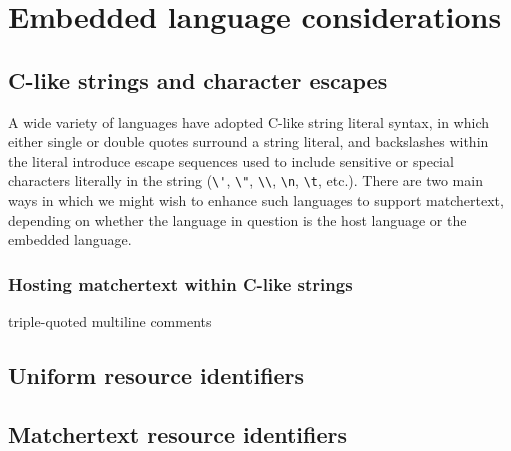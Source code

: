 \section{Embedded language considerations}
\label{sec:embed}

\subsection{C-like strings and character escapes}

A wide variety of languages have adopted C-like string literal syntax,
in which either single or double quotes surround a string literal,
and backslashes within the literal introduce escape sequences
used to include sensitive or special characters literally in the string
(\eg \verb|\'|, \verb|\"|, \verb|\\|, \verb|\n|, \verb|\t|, etc.).
There are two main ways in which we might wish to enhance such languages
to support matchertext,
depending on whether the language in question is the host language
or the embedded language.

\subsubsection{Hosting matchertext within C-like strings}


triple-quoted multiline comments


\subsection{Uniform resource identifiers}
\label{sec:embed:uri}


\subsection{Matchertext resource identifiers}
\label{sec:embed:mri}

